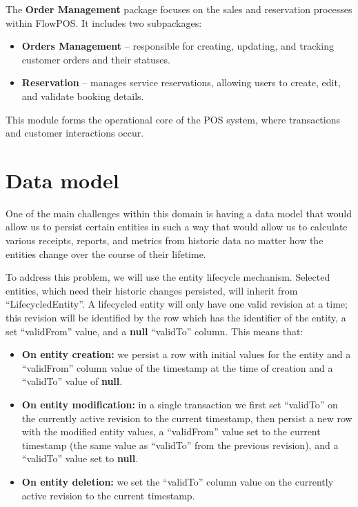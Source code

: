 \documentclass[11pt,a4paper,pdftex]{article}
\begin{document}
The \textbf{Order Management} package focuses on the sales and reservation processes within FlowPOS. 
It includes two subpackages:
\begin{itemize}
    \item \textbf{Orders Management} – responsible for creating, updating, and tracking customer orders and their statuses.
    \item \textbf{Reservation} – manages service reservations, allowing users to create, edit, and validate booking details.
\end{itemize}
This module forms the operational core of the POS system, where transactions and customer interactions occur.
%    
\section{Data model}
One of the main challenges within this domain is having a data model that would allow us to persist certain entities in such a way that would allow us to calculate various receipts, reports, and metrics from historic data no matter how the entities change over the course of their lifetime.

To address this problem, we will use the entity lifecycle mechanism. Selected entities, which need their historic changes persisted, will inherit from \enquote{LifecycledEntity}. A lifecycled entity will only have one valid revision at a time; this revision will be identified by the row which has the identifier of the entity, a set \enquote{validFrom} value, and a \textbf{null} \enquote{validTo} column. This means that:
\begin{itemize}
    \item \textbf{On entity creation:} we persist a row with initial values for the entity and a \enquote{validFrom} column value of the timestamp at the time of creation and a \enquote{validTo} value of \textbf{null}.
    \item \textbf{On entity modification:} in a single transaction we first set \enquote{validTo} on the currently active revision to the current timestamp, then persist a new row with the modified entity values, a \enquote{validFrom} value set to the current timestamp (the same value as \enquote{validTo} from the previous revision), and a \enquote{validTo} value set to \textbf{null}.
    \item \textbf{On entity deletion:} we set the \enquote{validTo} column value on the currently active revision to the current timestamp.
\end{itemize}
\end{document}
